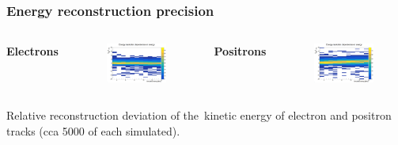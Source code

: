 \documentclass{beamer}
\begin{document}
	\begin{frame}
		\frametitle{Energy reconstruction precision}
		\centering
		\begin{columns}
			\centering
			\Large \textbf{Electrons}
			\begin{figure}
				\centering
				\includegraphics[width = 0.95 \linewidth]{../images/h_e_deltaenergy_energy.png}
			\end{figure}
			\centering
			\Large \textbf{Positrons}
			\begin{figure}
				\centering
				\includegraphics[width = 0.95 \linewidth]{../images/h_p_deltaenergy_energy.png}
			\end{figure}
		\end{columns}
		\vspace{0.5cm}
		\footnotesize{Relative reconstruction deviation of the~kinetic energy of electron and positron tracks (cca 5000 of each simulated).}
	\end{frame}
\end{document}
